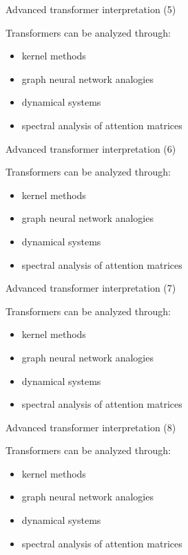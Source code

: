 \documentclass[aspectratio=169]{beamer}
\begin{document}
\begin{frame}{Advanced transformer interpretation (5)}

Transformers can be analyzed through:

\begin{itemize}
\item kernel methods
\item graph neural network analogies
\item dynamical systems
\item spectral analysis of attention matrices
\end{itemize}

\end{frame}


\begin{frame}{Advanced transformer interpretation (6)}

Transformers can be analyzed through:

\begin{itemize}
\item kernel methods
\item graph neural network analogies
\item dynamical systems
\item spectral analysis of attention matrices
\end{itemize}

\end{frame}


\begin{frame}{Advanced transformer interpretation (7)}

Transformers can be analyzed through:

\begin{itemize}
\item kernel methods
\item graph neural network analogies
\item dynamical systems
\item spectral analysis of attention matrices
\end{itemize}

\end{frame}


\begin{frame}{Advanced transformer interpretation (8)}

Transformers can be analyzed through:

\begin{itemize}
\item kernel methods
\item graph neural network analogies
\item dynamical systems
\item spectral analysis of attention matrices
\end{itemize}

\end{frame}
\end{document}
